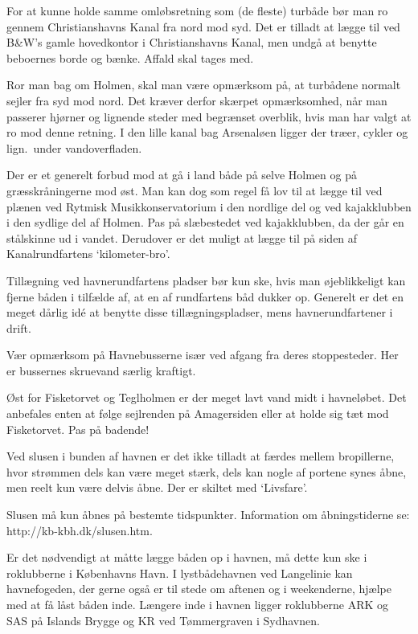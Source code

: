 \documentclass{article}
\begin{document}
For at kunne holde samme omløbsretning som (de fleste) turbåde bør man ro
gennem Christianshavns Kanal fra nord mod syd. Det er tilladt at lægge
til ved B\&W’s gamle hovedkontor i Christianshavns Kanal, men undgå at
benytte beboernes borde og bænke. Affald skal tages med.

Ror man bag om Holmen, skal man være opmærksom på, at turbådene normalt
sejler fra syd mod nord. Det kræver derfor skærpet opmærksomhed, når man
passerer hjørner og lignende steder med begrænset overblik, hvis man har
valgt at ro mod denne retning. I den lille kanal bag Arsenaløen ligger
der træer, cykler og lign.\ under vandoverfladen.

Der er et generelt forbud mod at gå i land både på selve Holmen og på
græsskråningerne mod øst. Man kan dog som regel få lov til at lægge til
ved plænen ved Rytmisk Musikkonservatorium i den nordlige del og ved
kajakklubben i den sydlige del af Holmen. Pas på slæbestedet ved
kajakklubben, da der går en stålskinne ud i vandet. Derudover er det
muligt at lægge til på siden af Kanalrundfartens `kilometer-bro'.

Tillægning ved havnerundfartens pladser bør kun ske, hvis man
øjeblikkeligt kan fjerne båden i tilfælde af, at en af rundfartens båd
dukker op. Generelt er det en meget dårlig idé at benytte disse
tillægningspladser, mens havnerundfartener i drift.

Vær opmærksom på Havnebusserne især ved afgang fra deres stoppesteder.
Her er bussernes skruevand særlig kraftigt.

Øst for Fisketorvet og Teglholmen er der meget lavt vand midt i
havneløbet. Det anbefales enten at følge sejlrenden på Amagersiden eller
at holde sig tæt mod Fisketorvet. Pas på badende!

Ved slusen i bunden af havnen er det ikke tilladt at færdes mellem
bropillerne, hvor strømmen dels kan være meget stærk, dels kan nogle af
portene synes åbne, men reelt kun være delvis åbne. Der er skiltet med
`Livsfare'.

Slusen må kun åbnes på bestemte tidspunkter. Information om
åbningstiderne se: http://kb-kbh.dk/slusen.htm.

Er det nødvendigt at måtte lægge båden op i havnen, må dette kun ske i
roklubberne i Københavns Havn. I lystbådehavnen ved Langelinie kan
havnefogeden, der gerne også er til stede om aftenen og i weekenderne,
hjælpe med at få låst båden inde. Længere inde i havnen ligger
roklubberne ARK og SAS på Islands Brygge og KR ved Tømmergraven i
Sydhavnen.
\end{document}
